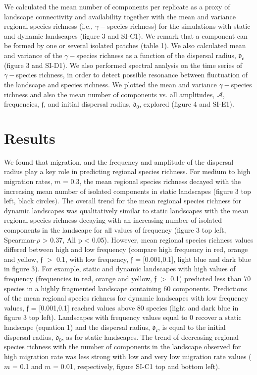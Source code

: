 \documentclass[12pt]{article}
\begin{document}
    We calculated the mean number of components per replicate as a proxy of landscape connectivity and availability together with the mean and variance regional species richness (i.e., $\gamma-$species richness) for the simulations with static and dynamic landscapes (figure 3 and SI-C1). We remark that a component can be formed by one or several isolated patches (table 1). We also calculated mean and variance of the $\gamma-$species richness as a function of the dispersal radius, $\mathfrak{d_{c}}$ (figure 3 and SI-D1). We also performed spectral analysis on the time series of $\gamma-$species richness, in order to detect possible resonance between fluctuation of the landscape and species richness. We plotted the mean and variance $\gamma-$species richness and also the mean number of components vs. all amplitudes, $\mathcal{A}$, frequencies, $\mathfrak{f}$, and initial dispersal radius, $\mathfrak{d_{0}}$, explored (figure 4 and SI-E1). 
    
    \section*{Results}
    
    We found that migration, and the frequency and amplitude of the dispersal radius play a key role in predicting regional species richness. For medium to high migration rates, $m$ = 0.3, the mean regional species richness decayed with the increasing mean number of isolated components in static landscapes (figure 3 top left, black circles). The overall trend for the mean regional species richness for dynamic landscapes was qualitatively similar to static landscapes with the mean regional species richness decaying with an increasing number of isolated components in the landscape for all values of frequency (figure 3 top left, Spearman-$\rho$ > 0.37, All p < 0.05). However, mean regional species richness values differed between high and low frequency (compare high frequency in red, orange and yellow, $\mathfrak{f}$ $>$ 0.1, with low frequency, $\mathfrak{f}$ = [0.001,0.1], light blue and dark blue in figure 3). For example, static and dynamic landscapes with high values of frequency (frequencies in red, orange and yellow, $\mathfrak{f}$ $>$ 0.1) predicted less than 70 species in a highly fragmented landscape containing 60 components. Predictions of the mean regional species richness for dynamic landscapes with low frequency values, $\mathfrak{f}$ = [0.001,0.1] reached values above 80 species (light and dark blue in figure 3 top left). Landscapes with frequency values equal to 0 recover a static landscape (equation 1) and the dispersal radius, $\mathfrak{d_{c}}$, is equal to the initial dispersal radius, $\mathfrak{d_{0}}$, as for static landscapes. The trend of decreasing regional species richness with the number of components in the landscape observed for high migration rate was less strong with low and very low migration rate values ($m$ = 0.1 and $m$ = 0.01, respectively, figure SI-C1 top and bottom left). 
    
\end{document}
